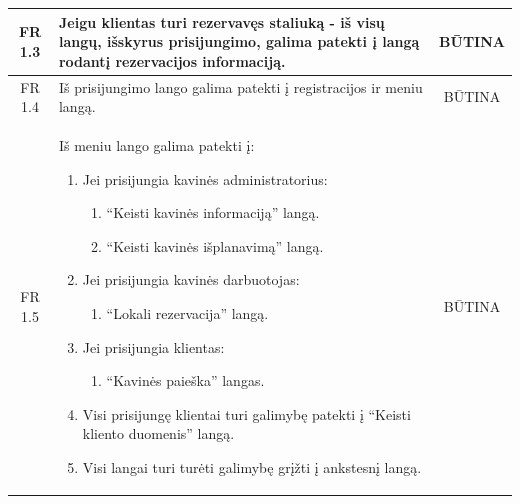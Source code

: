 \documentclass{VUMIFPSkursinis}
\begin{document}
\begin{center}
\begin{table}[H]
\begin{tabular}{|p{2cm}|p{}|p{}|}
		\multicolumn{1}{|c|}{FR 1.3}&
		{Jeigu klientas turi rezervavęs staliuką - iš visų langų, išskyrus \newline prisijungimo, galima patekti į langą rodantį rezervacijos informaciją.}&
		\multicolumn{1}{|c|}{BŪTINA}\\
	\hline
		\multicolumn{1}{|c|}{FR 1.4}&
		{Iš prisijungimo lango galima patekti į registracijos ir meniu langą.}&
		\multicolumn{1}{|c|}{BŪTINA}\\
	\hline
		\multicolumn{1}{|c|}{FR 1.5}&
		{Iš meniu lango galima patekti į:\newline
		\begin{enumerate}
			\item Jei prisijungia kavinės administratorius:
				\begin{enumerate}
					\item “Keisti kavinės informaciją” langą.
					\item “Keisti kavinės išplanavimą” langą.
				\end{enumerate}
			\item Jei prisijungia kavinės darbuotojas:
				\begin{enumerate}
					\item “Lokali rezervacija” langą.
				\end{enumerate}
			\item Jei prisijungia klientas:
				\begin{enumerate}
					\item “Kavinės paieška” langas.
				\end{enumerate}
			\item Visi prisijungę klientai turi galimybę patekti į “Keisti kliento duomenis” langą.
			\item Visi langai turi turėti galimybę grįžti į ankstesnį langą.
		\end{enumerate}
		}&
		\multicolumn{1}{|c|}{BŪTINA}\\		
	\hline
	
	\end{tabular}
	
	\label{table:AplikacijosLangai}
	\end{table}
	
\end{center}

\pagebreak
\end{document}
